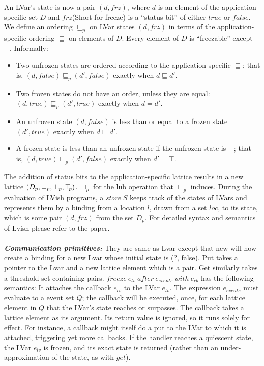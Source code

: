 \documentclass[twocolumn]{article}
\newcommand{\userleq}{\ensuremath{\sqsubseteq}}
\newcommand{\lubp}[2]{\ensuremath{#1 \sqcup_p #2}}
\newcommand{\leqp}{\ensuremath{\sqsubseteq_p}}
\newcommand{\botp}{\ensuremath{\bot_{p}}}
\newcommand{\topp}{\ensuremath{\top\hspace{-0.85mm}_{p}}}
\newcommand{\state}[2]{\ensuremath{(#1, #2)}}
\newcommand{\status}{\ensuremath{\mathit{frz}}}
\begin{document}
An LVar’s state is now a pair $(d,frz )$, where $d$ is an element of the application-specific set $D$ and $frz$(Short for freeze) is a “status bit” of either $true$ or $false$. We define an ordering $\leqp$ on LVar states $\state{d}{\status}$ in terms of the application-specific ordering $\userleq$ on elements of $D$. Every element of $D$ is ``freezable'' except $\top$. Informally: 
\begin{itemize}
\item Two unfrozen states are ordered according to the application-specific $\userleq$; that is, $(d,false) \leqp (d',false)$
exactly when $d \userleq d'$.
\item Two frozen states do not have an order, unless they are equal: $(d,true) \leqp (d',true)$ exactly when $d = d'$.
\item An unfrozen state $(d,false)$ is less than or equal to a frozen state $(d',true)$ exactly when $d \userleq d'$.
\item A frozen state is less than an unfrozen state if the unfrozen state is $\top$; that is, $(d,true) \leqp (d',false)$ exactly when $d' = \top$.
\end{itemize}
The addition of status bits to the application-specific lattice results in a new lattice $(D_p, \leqp, \botp, \topp)$. $\lubp{}{}$ for the lub operation that $\leqp$ induces. During the evaluation of LVish programs, a \emph{store} $S$ keeps track of the states of LVars and represents them by a binding from a location $l$, drawn from a set $loc$, to its state, which is some pair $(d, frz)$ from the set $D_p$. For detailed syntax and semantics of Lvish please refer to the paper\cite{lkuper2}.\\ \\
\textbf{\textit{Communication primitives:}} They are same as Lvar except that new will now create a binding for a new Lvar whose initial state is (?, false). Put takes a pointer to the Lvar and a new lattice element which is a pair. Get similarly takes a threshold set containing pairs. $freeze\ e_{lv}\ after\ e_{events}\ with\ e_{cb}$ has the following semantics: It attaches the callback $e_{cb}$ to the LVar $e_{lv}$. The expression $e_{events}$ must evaluate to a event set $Q$; the callback will be executed, once, for each lattice element in $Q$ that the LVar’s state reaches or surpasses. The callback takes a lattice element as its argument. Its return value is ignored, so it runs solely for effect. For instance, a callback might itself do a put to the LVar to which it is attached, triggering yet more callbacks. If the handler reaches a quiescent state, the LVar $e_{lv}$ is frozen, and its exact state is returned (rather than an under-approximation of the state, as with $get$).
\end{document}
